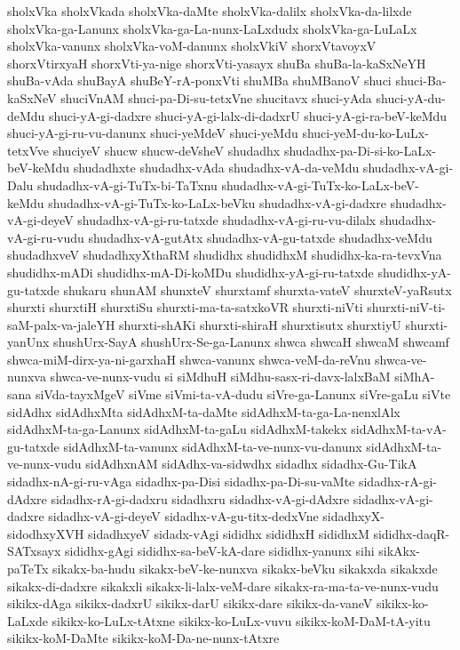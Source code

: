 {sholxVka
sholxVkada
sholxVka-daMte
sholxVka-dalilx
sholxVka-da-lilxde
sholxVka-ga-Lanunx
sholxVka-ga-La-nunx-LaLxdudx
sholxVka-ga-LuLaLx
sholxVka-vanunx
sholxVka-voM-danunx
sholxVkiV
shorxVtavoyxV
shorxVtirxyaH
shorxVti-ya-nige
shorxVti-yasayx
shuBa
shuBa-la-kaSxNeYH
shuBa-vAda
shuBayA
shuBeY-rA-ponxVti
shuMBa
shuMBanoV
shuci
shuci-Ba-kaSxNeV
shuciVnAM
shuci-pa-Di-su-tetxVne
shucitavx
shuci-yAda
shuci-yA-du-deMdu
shuci-yA-gi-dadxre
shuci-yA-gi-lalx-di-dadxrU
shuci-yA-gi-ra-beV-keMdu
shuci-yA-gi-ru-vu-danunx
shuci-yeMdeV
shuci-yeMdu
shuci-yeM-du-ko-LuLx-tetxVve
shuciyeV
shucw
shucw-deVsheV
shudadhx
shudadhx-pa-Di-si-ko-LaLx-beV-keMdu
shudadhxte
shudadhx-vAda
shudadhx-vA-da-veMdu
shudadhx-vA-gi-Dalu
shudadhx-vA-gi-TuTx-bi-TaTxnu
shudadhx-vA-gi-TuTx-ko-LaLx-beV-keMdu
shudadhx-vA-gi-TuTx-ko-LaLx-beVku
shudadhx-vA-gi-dadxre
shudadhx-vA-gi-deyeV
shudadhx-vA-gi-ru-tatxde
shudadhx-vA-gi-ru-vu-dilalx
shudadhx-vA-gi-ru-vudu
shudadhx-vA-gutAtx
shudadhx-vA-gu-tatxde
shudadhx-veMdu
shudadhxveV
shudadhxyXthaRM
shudidhx
shudidhxM
shudidhx-ka-ra-tevxVna
shudidhx-mADi
shudidhx-mA-Di-koMDu
shudidhx-yA-gi-ru-tatxde
shudidhx-yA-gu-tatxde
shukaru
shunAM
shunxteV
shurxtamf
shurxta-vateV
shurxteV-yaRsutx
shurxti
shurxtiH
shurxtiSu
shurxti-ma-ta-satxkoVR
shurxti-niVti
shurxti-niV-ti-saM-palx-va-jaleYH
shurxti-shAKi
shurxti-shiraH
shurxtisutx
shurxtiyU
shurxti-yanUnx
shushUrx-SayA
shushUrx-Se-ga-Lanunx
shwca
shwcaH
shwcaM
shwcamf
shwca-miM-dirx-ya-ni-garxhaH
shwca-vanunx
shwca-veM-da-reVnu
shwca-ve-nunxva
shwca-ve-nunx-vudu
si
siMdhuH
siMdhu-sasx-ri-davx-lalxBaM
siMhA-sana
siVda-tayxMgeV
siVme
siVmi-ta-vA-dudu
siVre-ga-Lanunx
siVre-gaLu
siVte
sidAdhx
sidAdhxMta
sidAdhxM-ta-daMte
sidAdhxM-ta-ga-La-nenxlAlx
sidAdhxM-ta-ga-Lanunx
sidAdhxM-ta-gaLu
sidAdhxM-takekx
sidAdhxM-ta-vA-gu-tatxde
sidAdhxM-ta-vanunx
sidAdhxM-ta-ve-nunx-vu-danunx
sidAdhxM-ta-ve-nunx-vudu
sidAdhxnAM
sidAdhx-va-sidwdhx
sidadhx
sidadhx-Gu-TikA
sidadhx-nA-gi-ru-vAga
sidadhx-pa-Disi
sidadhx-pa-Di-su-vaMte
sidadhx-rA-gi-dAdxre
sidadhx-rA-gi-dadxru
sidadhxru
sidadhx-vA-gi-dAdxre
sidadhx-vA-gi-dadxre
sidadhx-vA-gi-deyeV
sidadhx-vA-gu-titx-dedxVne
sidadhxyX-sidodhxyXVH
sidadhxyeV
sidadx-vAgi
sididhx
sididhxH
sididhxM
sididhx-daqR-SATxsayx
sididhx-gAgi
sididhx-sa-beV-kA-dare
sididhx-yanunx
sihi
sikAkx-paTeTx
sikakx-ba-hudu
sikakx-beV-ke-nunxva
sikakx-beVku
sikakxda
sikakxde
sikakx-di-dadxre
sikakxli
sikakx-li-lalx-veM-dare
sikakx-ra-ma-ta-ve-nunx-vudu
sikikx-dAga
sikikx-dadxrU
sikikx-darU
sikikx-dare
sikikx-da-vaneV
sikikx-ko-LaLxde
sikikx-ko-LuLx-tAtxne
sikikx-ko-LuLx-vuvu
sikikx-koM-DaM-tA-yitu
sikikx-koM-DaMte
sikikx-koM-Da-ne-nunx-tAtxre
}

